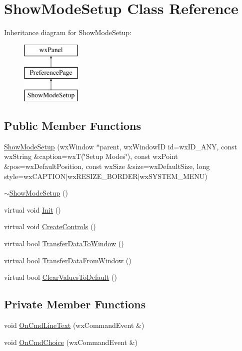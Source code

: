 \hypertarget{a00141}{\section{Show\-Mode\-Setup Class Reference}
\label{a00141}
}
Inheritance diagram for Show\-Mode\-Setup\-:\begin{figure}[H]
\begin{center}
\leavevmode
\includegraphics[height=3.000000cm]{a00141}
\end{center}
\end{figure}
\subsection*{Public Member Functions}
\begin{DoxyCompactItemize}
\item 
\hyperlink{a00141_a0a260117e5546982ab8207f932aaff72}{Show\-Mode\-Setup} (wx\-Window $\ast$parent, wx\-Window\-I\-D id=wx\-I\-D\-\_\-\-A\-N\-Y, const wx\-String \&caption=wx\-T(\char`\"{}Setup Modes\char`\"{}), const wx\-Point \&pos=wx\-Default\-Position, const wx\-Size \&size=wx\-Default\-Size, long style=wx\-C\-A\-P\-T\-I\-O\-N$\vert$wx\-R\-E\-S\-I\-Z\-E\-\_\-\-B\-O\-R\-D\-E\-R$\vert$wx\-S\-Y\-S\-T\-E\-M\-\_\-\-M\-E\-N\-U)
\item 
\hyperlink{a00141_a65720766a7eb080bbbe7c2d115a55112}{$\sim$\-Show\-Mode\-Setup} ()
\item 
virtual void \hyperlink{a00141_a61cef0fe08eef977e7df229655859060}{Init} ()
\item 
virtual void \hyperlink{a00141_a2c8ada463f140af40fa89bd514fa235d}{Create\-Controls} ()
\item 
virtual bool \hyperlink{a00141_a576b720cc79bb0071c7ae7c14d800d49}{Transfer\-Data\-To\-Window} ()
\item 
virtual bool \hyperlink{a00141_a6278edbdae797cbc532e7fb94eb3a20d}{Transfer\-Data\-From\-Window} ()
\item 
virtual bool \hyperlink{a00141_a982a71fb0551203dca4da1411df31ef6}{Clear\-Values\-To\-Default} ()
\end{DoxyCompactItemize}
\subsection*{Private Member Functions}
\begin{DoxyCompactItemize}
\item 
void \hyperlink{a00141_ab52bdddb82d7a8f67d967408d821b035}{On\-Cmd\-Line\-Text} (wx\-Command\-Event \&)
\item 
void \hyperlink{a00141_a23e219740e84520331c6df4517d2f554}{On\-Cmd\-Choice} (wx\-Command\-Event \&)
\end{DoxyCompactItemize}
